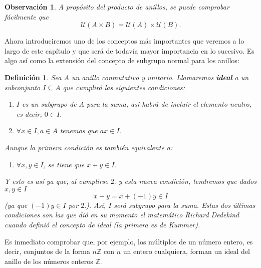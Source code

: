 \documentclass[12pt]{article}
\newtheorem{definition}[theorem]{Definición}
\newtheorem{observation}{Observación}[theorem]
\begin{document}
\begin{observation}A propósito del producto de anillos, se puede comprobar fácilmente que $$\mathcal{U}(A \times B) = \mathcal{U}(A) \times \mathcal{U}(B).$$
\end{observation}

Ahora introduciremos uno de los conceptos más importantes que veremos a lo largo de este capítulo y que será de todavía mayor importancia en lo sucesivo. Es algo así como la extensión del concepto de subgrupo normal para los anillos: 

\begin{definition}Sea $A$ un anillo conmutativo y unitario. Llamaremos \textbf{ideal} a un subconjunto $I \subseteq A$ que cumplirá las siguientes condiciones: \renewcommand{\labelenumi}{\arabic{enumi}.}
\begin{enumerate}
\item $I$ es un subgrupo de $A$ para la suma, así habrá de incluir el elemento neutro, es decir, $0 \in I$.
\item $\forall x \in I, a \in A$ tenemos que $ax \in I$.
\end{enumerate}
Aunque la primera condición es también equivalente a: \begin{enumerate}
\item $\forall x,y \in I$, se tiene que $x+y \in I$. 
\end{enumerate}
Y esto es así ya que, al cumplirse $2.$ y esta nueva condición, tendremos que dados $x,y \in I$ $$x-y = x +(-1)y \in I$$ (ya que $(-1)y \in I$ por $2.$). Así, $I$ será subgrupo para la suma. Estas dos últimas condiciones son las que dió en su momento el matemático Richard Dedekind cuando definió el concepto de ideal (la primera es de Kummer).
\end{definition}

Es inmediato comprobar que, por ejemplo, los múltiplos de un número entero, es decir, conjuntos de la forma $n\mathbb{Z}$ con $n$ un entero cualquiera, forman un ideal del anillo de los números enteros $\mathbb{Z}$.
\end{document}
